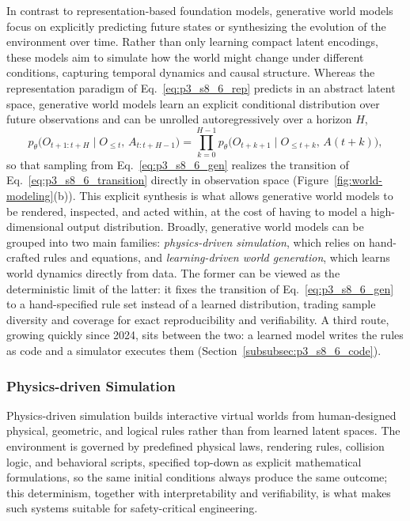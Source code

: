 In contrast to representation-based foundation models, generative world models focus on explicitly predicting future states or synthesizing the evolution of the environment over time.
Rather than only learning compact latent encodings, these models aim to simulate how the world might change under different conditions, capturing temporal dynamics and causal structure.
Whereas the representation paradigm of Eq.~\eqref{eq:p3_s8_6_rep} predicts in an abstract latent space, generative world models learn an explicit conditional distribution over future observations and can be unrolled autoregressively over a horizon $H$,
\begin{equation}
\label{eq:p3_s8_6_gen}
p_\theta\big(O_{t+1:t+H} \mid O_{\le t},\, A_{t:t+H-1}\big) = \prod_{k=0}^{H-1} p_\theta\big(O_{t+k+1} \mid O_{\le t+k},\, A(t+k)\big),
\end{equation}
so that sampling from Eq.~\eqref{eq:p3_s8_6_gen} realizes the transition of Eq.~\eqref{eq:p3_s8_6_transition} directly in observation space (Figure~\ref{fig:world-modeling}(b)).
This explicit synthesis is what allows generative world models to be rendered, inspected, and acted within, at the cost of having to model a high-dimensional output distribution.
Broadly, generative world models can be grouped into two main families:
\emph{physics-driven simulation}, which relies on hand-crafted rules and equations,
and \emph{learning-driven world generation}, which learns world dynamics directly from data.
The former can be viewed as the deterministic limit of the latter: it fixes the transition of Eq.~\eqref{eq:p3_s8_6_gen} to a hand-specified rule set instead of a learned distribution, trading sample diversity and coverage for exact reproducibility and verifiability.
A third route, growing quickly since 2024, sits between the two: a learned model writes the rules as code and a simulator executes them (Section~\ref{subsubsec:p3_s8_6_code}).



\subsubsection{Physics-driven Simulation}

Physics-driven simulation builds interactive virtual worlds from human-designed physical, geometric, and logical rules rather than from learned latent spaces. The environment is governed by predefined physical laws, rendering rules, collision logic, and behavioral scripts, specified top-down as explicit mathematical formulations, so the same initial conditions always produce the same outcome; this determinism, together with interpretability and verifiability, is what makes such systems suitable for safety-critical engineering.

